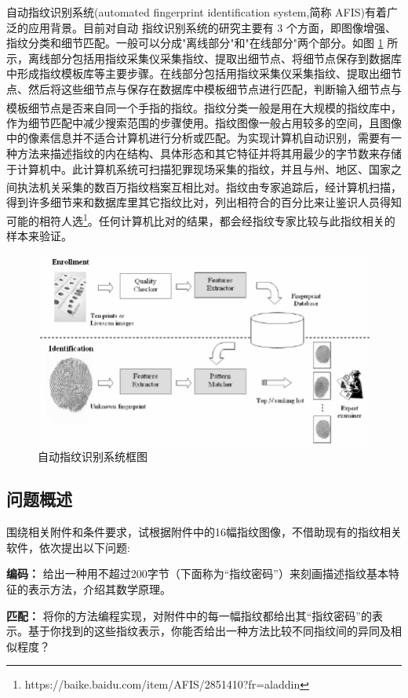\documentclass{whutmod}
\newcommand{\upcite}[1]{\textsuperscript{\cite{#1}}}
\begin{document}
自动指纹识别系统(automated fingerprint identification system,简称 AFIS)有着广泛的应用背景。目前对自动 指纹识别系统的研究主要有 3 个方面，即图像增强、指纹分类和细节匹配。一般可以分成"离线部分"和"在线部分"两个部分。如图 \ref{lssct} 所示，离线部分包括用指纹采集仪采集指纹、提取出细节点、将细节点保存到数据库中形成指纹模板库等主要步骤。在线部分包括用指纹采集仪采集指纹、提取出细节点、然后将这些细节点与保存在数据库中模板细节点进行匹配，判断输入细节点与模板细节点是否来自同一个手指的指纹\upcite{1,3}。指纹分类一般是用在大规模的指纹库中，作为细节匹配中减少搜索范围的步骤使用。指纹图像一般占用较多的空间，且图像中的像素信息并不适合计算机进行分析或匹配。为实现计算机自动识别，需要有一种方法来描述指纹的内在结构、具体形态和其它特征并将其用最少的字节数来存储于计算机中。此计算机系统可扫描犯罪现场采集的指纹，并且与州、地区、国家之间执法机关采集的数百万指纹档案互相比对\upcite{2}。指纹由专家追踪后，经计算机扫描，得到许多细节来和数据库里其它指纹比对，列出相符合的百分比来让鉴识人员得知可能的相符人选\footnote{\quad https://baike.baidu.com/item/AFIS/2851410?fr=aladdin}。任何计算机比对的结果，都会经指纹专家比较与此指纹相关的样本来验证。
\begin{figure}[H]
	\centering
	\includegraphics[width=.8\textwidth]{figures/AFIS.png}
	\caption{自动指纹识别系统框图 }\label{lssct}
\end{figure}

		\subsection{问题概述}
		    围绕相关附件和条件要求，试根据附件中的16幅指纹图像，不借助现有的指纹相关软件，依次提出以下问题:
				 
			\textbf{编码：} 给出一种用不超过200字节（下面称为“指纹密码”）来刻画描述指纹基本特征的表示方法，介绍其数学原理。
			
			\textbf{匹配：} 将你的方法编程实现，对附件中的每一幅指纹都给出其“指纹密码”的表示。基于你找到的这些指纹表示，你能否给出一种方法比较不同指纹间的异同及相似程度？
			
\end{document}
